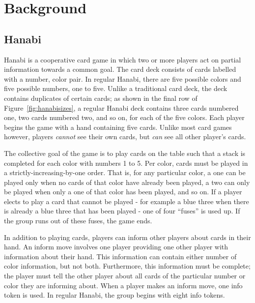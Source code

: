 \section{Background}
\label{sec:background}

\subsection{Hanabi}
\label{sec:background:hanabi}

Hanabi \cite{hanabiboardgame, hanabiwiki} is a cooperative card game in which
two or more players act on partial information towards a common goal. The
card deck consists of cards labelled with a number, color pair. In regular
Hanabi, there are five possible colors and five possible numbers, one to five.
Unlike a traditional card deck, the deck contains duplicates of certain cards;
as shown in the final row of Figure~\ref{fig:hanabisizes}, a regular Hanabi
deck contains three cards numbered one, two cards numbered two, and so on, for
each of the five colors. Each player begins the game with a hand containing
five cards. Unlike most card games however, players \emph{cannot} see their
own cards, but \emph{can} see all other player's cards.

The collective goal of the game is to play cards on the table such that a stack
is completed for each color with numbers 1 to 5. Per color, cards must be
played in a strictly-increasing-by-one order. That is, for any particular
color, a one can be played only when no cards of that color have already been
played, a two can only be played when only a one of that color has been played,
and so on.  If a player elects to play a card that cannot be played - for
example a blue three when there is already a blue three that has been played
- one of four ``fuses'' is used up. If the group runs out of these fuses, the
game ends.

In addition to playing cards, players can inform other players about cards
in their hand. An inform move involves one player providing one other player
with information about their hand. This information can contain either number
of color information, but not both. Furthermore, this information must be complete;
the player must tell the other player about all cards of the particular number or
color they are informing about. When a player makes an inform move, one info
token is used. In regular Hanabi, the group begins with eight info tokens.

